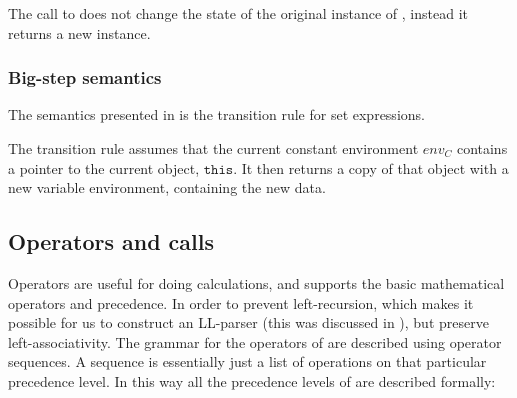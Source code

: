 The call to  does not change the state of the original
instance of , instead it returns a new instance.

\subsubsection{Big-step semantics}

The semantics presented in  is the transition rule for
set expressions.



The transition rule assumes that the current constant environment $env_C$
contains a pointer to the current object, $\texttt{this}$. It then returns a
copy of that object with a new variable environment, containing the new data.

\subsection{Operators and calls}
\label{sec:operatorsandcalls}

Operators are useful for doing calculations, and \productname{} supports the
basic mathematical operators and precedence. In order to prevent left-recursion,
which makes it possible for us to construct an LL-parser (this was discussed in
), but preserve left-associativity. The
grammar for the operators of \productname{} are described using operator
sequences. A sequence is essentially just a list of operations on that
particular precedence level. In this way all the precedence levels of
\productname{} are described formally:

\begin{ebnf}
\end{ebnf}

